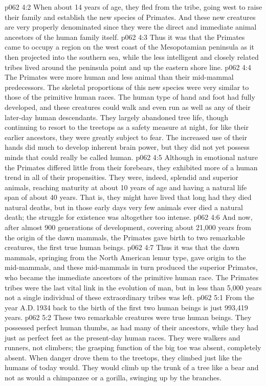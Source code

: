 \vs p062 4:2 When about 14 years of age, they fled from the tribe, going west to raise their family and establish the new species of Primates. And these new creatures are very properly denominated  since they were the direct and immediate animal ancestors of the human family itself.
\vs p062 4:3 Thus it was that the Primates came to occupy a region on the west coast of the Mesopotamian peninsula as it then projected into the southern sea, while the less intelligent and closely related tribes lived around the peninsula point and up the eastern shore line.
\vs p062 4:4 \pc The Primates were more human and less animal than their mid\hyp{}mammal predecessors. The skeletal proportions of this new species were very similar to those of the primitive human races. The human type of hand and foot had fully developed, and these creatures could walk and even run as well as any of their later\hyp{}day human descendants. They largely abandoned tree life, though continuing to resort to the treetops as a safety measure at night, for like their earlier ancestors, they were greatly subject to fear. The increased use of their hands did much to develop inherent brain power, but they did not yet possess minds that could really be called human.
\vs p062 4:5 Although in emotional nature the Primates differed little from their forebears, they exhibited more of a human trend in all of their propensities. They were, indeed, splendid and superior animals, reaching maturity at about 10 years of age and having a natural life span of about 40 years. That is, they might have lived that long had they died natural deaths, but in those early days very few animals ever died a natural death; the struggle for existence was altogether too intense.
\vs p062 4:6 And now, after almost 900 generations of development, covering about 21,000 years from the origin of the dawn mammals, the Primates  gave birth to two remarkable creatures, the first true human beings.
\vs p062 4:7 \pc Thus it was that the dawn mammals, springing from the North American lemur type, gave origin to the mid\hyp{}mammals, and these mid\hyp{}mammals in turn produced the superior Primates, who became the immediate ancestors of the primitive human race. The Primates tribes were the last vital link in the evolution of man, but in less than 5,000 years not a single individual of these extraordinary tribes was left.
\vs p062 5:1 From the year A.D.\,1934 back to the birth of the first two human beings is just 993,419 years.
\vs p062 5:2 These two remarkable creatures were true human beings. They possessed perfect human thumbs, as had many of their ancestors, while they had just as perfect feet as the present\hyp{}day human races. They were walkers and runners, not climbers; the grasping function of the big toe was absent, completely absent. When danger drove them to the treetops, they climbed just like the humans of today would. They would climb up the trunk of a tree like a bear and not as would a chimpanzee or a gorilla, swinging up by the branches.
